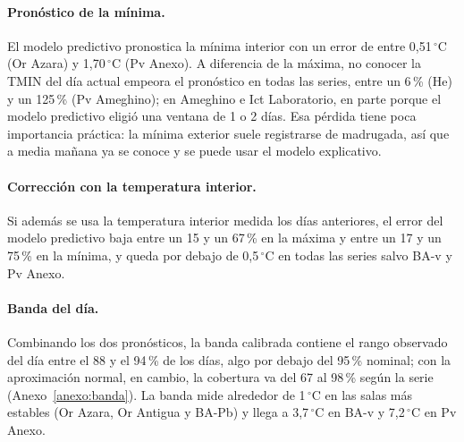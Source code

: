\documentclass[11pt,a4paper]{article}
\begin{document}
\paragraph{Pronóstico de la mínima.} El modelo predictivo pronostica la mínima interior con un error de entre 0{,}51\,$^\circ$C (Or Azara) y 1{,}70\,$^\circ$C (Pv Anexo). A diferencia de la máxima, no conocer la TMIN del día actual empeora el pronóstico en todas las series, entre un 6\,\% (He) y un 125\,\% (Pv Ameghino); en Ameghino e Ict Laboratorio, en parte porque el modelo predictivo eligió una ventana de 1 o 2 días. Esa pérdida tiene poca importancia práctica: la mínima exterior suele registrarse de madrugada, así que a media mañana ya se conoce y se puede usar el modelo explicativo.

\paragraph{Corrección con la temperatura interior.} Si además se usa la temperatura interior medida los días anteriores, el error del modelo predictivo baja entre un 15 y un 67\,\% en la máxima y entre un 17 y un 75\,\% en la mínima, y queda por debajo de 0{,}5\,$^\circ$C en todas las series salvo BA-v y Pv Anexo.

\paragraph{Banda del día.}
\label{sec:banda}
Combinando los dos pronósticos, la banda calibrada contiene el rango observado del día entre el 88 y el 94\,\% de los días, algo por debajo del 95\,\% nominal; con la aproximación normal, en cambio, la cobertura va del 67 al 98\,\% según la serie (Anexo~\ref{anexo:banda}). La banda mide alrededor de 1\,$^\circ$C en las salas más estables (Or Azara, Or Antigua y BA-Pb) y llega a 3{,}7\,$^\circ$C en BA-v y 7{,}2\,$^\circ$C en Pv Anexo.
\end{document}
